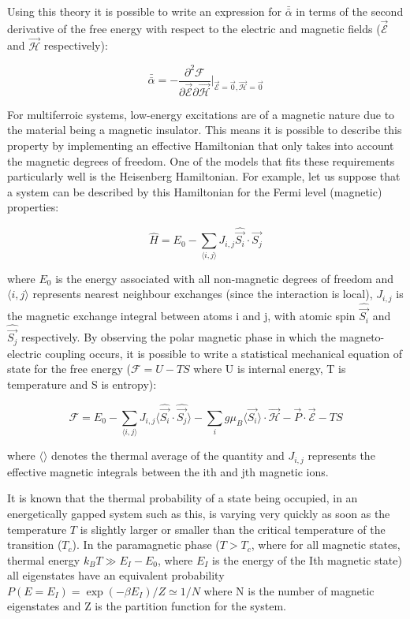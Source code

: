 \documentclass[10pt]{article}
\begin{document}
Using this theory it is possible to write an expression for $\bar{\bar{\alpha}}$ in terms of the second derivative of the free energy with respect to the electric and magnetic fields ($\vec{\mathcal{E}}$ and $\vec{\mathcal{H}}$ respectively):

\begin{equation*}
\bar{\bar{\alpha}} = -\frac{\partial^2 \mathcal{F}}{\partial \vec{\mathcal{E}}\partial\vec{\mathcal{H}}}\biggr\vert_{\vec{\mathcal{E}}=\vec{0}, \vec{\mathcal{H}} = \vec{0}}
\end{equation*}

For multiferroic systems, low-energy excitations are of a magnetic nature due to the material being a magnetic insulator. This means it is possible to describe this property by implementing an effective Hamiltonian that only takes into account the magnetic degrees of freedom. One of the models that fits these requirements particularly well is the Heisenberg Hamiltonian. For example, let us suppose that a system can be described by this Hamiltonian for the Fermi level (magnetic) properties:

\begin{equation}
\hat{H} = E_0 - \sum_{\langle i,j \rangle} J_{i,j}\hat{\vec{S_i}}\cdot \hat{\vec{S_j}}
\end{equation}

where $E_0$ is the energy associated with all non-magnetic degrees of freedom and $\langle i,j \rangle$ represents nearest neighbour exchanges (since the interaction is local), $J_{i,j}$ is the magnetic exchange integral between atoms i and j, with atomic spin $\hat{\vec{S_i}}$ and $\hat{\vec{S_j}}$ respectively. By observing the polar magnetic phase in which the magneto-electric coupling occurs, it is possible to write a statistical mechanical equation of state for the free energy ($\mathcal{F} = U - TS$ where U is internal energy, T is temperature and S is entropy):

\begin{equation*}
\mathcal{F} = E_0 - \sum_{\langle i,j \rangle} J_{i,j}\langle \hat{\vec{S_i}}\cdot \hat{\vec{S_j}} \rangle - \sum_{i}g\mu_{B}\langle \vec{S_i}\rangle \cdot \mathcal{\vec{H}} - \vec{P}\cdot \mathcal{\vec{E}} - TS
\end{equation*}

where $\langle \rangle$ denotes the thermal average of the quantity and $J_{i,j}$ represents the effective magnetic integrals between the ith and jth magnetic ions. 

It is known that the thermal probability of a state being occupied, in an energetically gapped system such as this, is varying very quickly as soon as the temperature $T$ is slightly larger or smaller than the critical temperature of the transition ($T_c$). In the paramagnetic phase ($T > T_c$, where for all magnetic states, thermal energy $k_B T \gg E_I - E_0$, where $E_I$ is the energy of the Ith magnetic state) all eigenstates have an equivalent probability $P(E = E_I) = \exp(-\beta E_I)/Z \simeq 1/N$ where N is the number of magnetic eigenstates and Z is the partition function for the system. 
\end{document}
